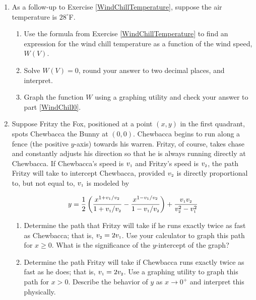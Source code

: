 \begin{enumerate}
\begin{enumerate}
\end{enumerate}

\item  As a follow-up to Exercise \ref{WindChillTemperature}, suppose the air temperature is $28^{\circ}$F.  

\begin{enumerate}

\item Use the formula from Exercise \ref{WindChillTemperature} to find an expression for the wind chill temperature as a function of the wind speed, $W(V)$.  

\item  \label{WindChill0} Solve $W(V) = 0$, round your answer to two decimal places,  and interpret.  

\item  Graph the function $W$ using a graphing utility and check your answer to part \ref{WindChill0}. 


\end{enumerate}


\item \label{pursuitfurther} Suppose Fritzy the Fox, positioned at a point $(x,y)$ in the first quadrant, spots Chewbacca the Bunny at $(0,0)$.   Chewbacca begins to run along a fence (the positive $y$-axis) towards his warren.  Fritzy, of course, takes chase and constantly adjusts his direction so that he is always running directly at Chewbacca.  If Chewbacca's speed is $v_{\mbox{\tiny$1$}}$ and  Fritzy's speed is $v_{\mbox{\tiny$2$}}$, the path Fritzy will take to intercept Chewbacca, provided $v_{\mbox{\tiny$2$}}$ is directly proportional to, but not equal to, $v_{\mbox{\tiny$1$}}$ is modeled by

\[ y = \dfrac{1}{2} \left(\dfrac{x^{1+ v_{1}/v_{2}}}{1+v_{\mbox{\tiny$1$}}/v_{\mbox{\tiny$2$}}}- \dfrac{x^{1-v_{\mbox{\tiny$1$}}/v_{\mbox{\tiny$2$}}}}{1-v_{\mbox{\tiny$1$}}/v_{\mbox{\tiny$2$}}}\right) + \dfrac{v_{\mbox{\tiny$1$}} v_{\mbox{\tiny$2$}}}{v_{\mbox{\tiny$2$}}^2-v_{\mbox{\tiny$1$}}^2} \]

\begin{enumerate}

\item  Determine the path that Fritzy will take if he runs exactly twice as fast as Chewbacca;  that is, $v_{\mbox{\tiny$2$}} = 2v_{\mbox{\tiny$1$}}$. Use your calculator to graph this path for $x \geq 0$.  What is the significance of the $y$-intercept of the graph?

\item  Determine the path Fritzy will take if Chewbacca runs exactly twice as fast as he does;  that is, $v_{\mbox{\tiny$1$}} = 2v_{\mbox{\tiny$2$}}$.  Use a graphing utility to graph this path for $x > 0$.  Describe the behavior of $y$ as $x \rightarrow 0^{+}$ and interpret this physically.


\end{enumerate}
\end{enumerate}
